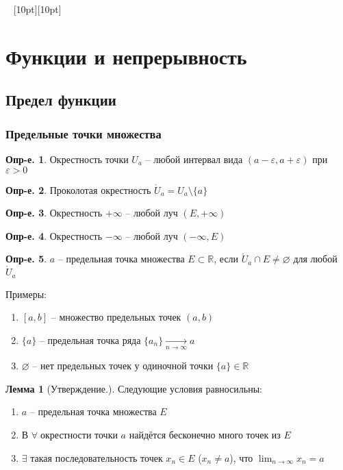 \documentclass[a4paper,12pt]{article}
\numberwithin{figure}{section}
\theoremstyle{definition}
\newtheorem{definition}{Опр-е.}[section]
\theoremstyle{definition}
\newtheorem{lemma}{Лемма}[section]
\def\DS{\displaystyle}
\def\eps{\varepsilon}
\def\ntoinf{n \to \infty}
\def\ringU{\mathring{U}}
\def\mathR{\mathbb{R}}
\def\any {$\forall\;$}
\def\vignette {\vspace{48pt} \noindent \hrulefill~ \raisebox{-8pt}[10pt][10pt]{\Huge\ding{102}}~ \hrulefill}
\begin{document}
\vignette
\section{Функции и непрерывность}


\subsection{Предел функции}

\subsubsection{Предельные точки множества}

\begin{definition} Окрестность точки $U_a$ -- любой интервал вида $(a-\eps,a+\eps)$ при $\eps>0$ \end{definition}

\begin{definition} Проколотая окрестность $\ringU_a = U_a \setminus \{a\}$ \end{definition}

\begin{definition} Окрестность $+\infty$ -- любой луч $(E,+\infty)$ \end{definition}

\begin{definition} Окрестность $-\infty$ -- любой луч $(-\infty,E)$ \end{definition}

\begin{definition}
	$a$ -- предельная точка множества $E \subset \mathR$,
	если $\ringU_a \cap E \neq \varnothing$ для любой $\ringU_a$
\end{definition}

\bigbreak
Примеры:\begin{enumerate}
	\item $[a,b]$ -- множество предельных точек $(a,b)$
	\item $\{a\}$ -- предельная точка ряда $\{a_n\}\xrightarrow[\ntoinf]{}a$
	\item $\varnothing$ -- нет предельных точек у одиночной точки $\{a\} \in \mathR$
\end{enumerate}

\begin{lemma}[Утверждение.]
  Следующие условия равносильны:
  \begin{enumerate}
	\item $a$ -- предельная точка множества $E$
	\item В \any окрестности точки $a$ найдётся бесконечно много точек из $E$
	\item $\exists$ такая последовательность точек $x_n \in E$ ($x_n \neq a$),
		  что $\DS \lim_{\ntoinf}x_n=a$
  \end{enumerate}
\end{lemma}
\end{document}
